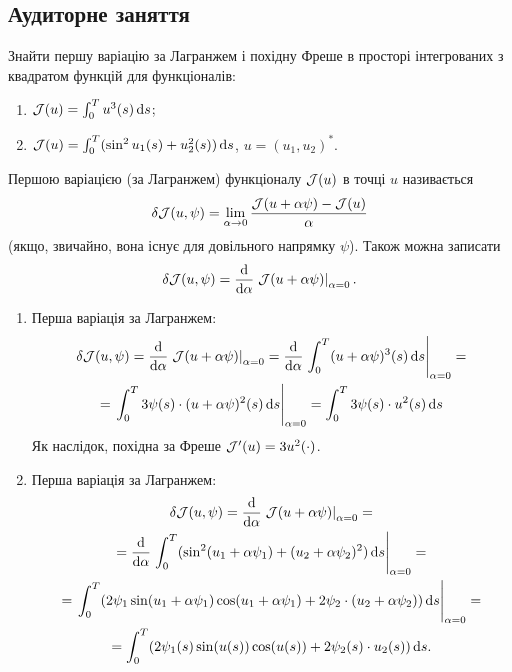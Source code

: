 \newpage

\subsection{Аудиторне заняття}

\begin{problem}
	Знайти першу варіацію за Лагранжем і похідну Фреше в просторі інтегрованих з квадратом функцій для функціоналів:
	\begin{enumerate}
		\item $\mathcal{J} (u) = \int_0^T u^3(s) \mathop{}\!\mathrm{d} s$;

		\item $\mathcal{J} (u) = \int_0^T (\sin^2 u_1(s) + u_2^2(s)) \mathop{}\!\mathrm{d} s$, $u = (u_1, u_2)^*$.
	\end{enumerate}
\end{problem}

\begin{solution}
	Першою варіацією (за Лагранжем) функціоналу $\mathcal{J}(u)$ в точці $u$ називається \[\delta \mathcal{J}(u, \psi) = \lim\limits_{\alpha \to 0} \frac{\mathcal{J}(u + \alpha \psi) - \mathcal{J}(u)}{\alpha}\] (якщо, звичайно, вона існує для довільного напрямку $\psi$). Також можна записати \[ \delta \mathcal{J}(u, \psi) = \frac{\mathop{}\!\mathrm{d}}{\mathop{}\!\mathrm{d} \alpha} \left.\mathcal{J}(u + \alpha \psi)\right|_{\alpha = 0}. \]

	\begin{enumerate}
		\item Перша варіація за Лагранжем:
		\begin{multline*} 
			\delta \mathcal{J}(u, \psi) = \frac{\mathop{}\!\mathrm{d}}{\mathop{}\!\mathrm{d} \alpha} \left.\mathcal{J}(u + \alpha \psi)\right|_{\alpha = 0} = \frac{\mathop{}\!\mathrm{d}}{\mathop{}\!\mathrm{d} \alpha} \left.\int_0^T(u + \alpha \psi)^3(s) \mathop{}\!\mathrm{d} s\right|_{\alpha = 0} = \\
			= \left.\int_0^T 3 \psi(s) \cdot (u + \alpha \psi)^2(s) \mathop{}\!\mathrm{d} s\right|_{\alpha = 0} = \int_0^T 3 \psi(s) \cdot u^2(s) \mathop{}\!\mathrm{d} s
		\end{multline*} 
		Як наслідок, похідна за Фреше $\mathcal{J}'(u) = 3 u^2(\cdot)$.

		\item Перша варіація за Лагранжем:
		\begin{multline*} 
			\delta \mathcal{J}(u, \psi) = \frac{\mathop{}\!\mathrm{d}}{\mathop{}\!\mathrm{d} \alpha} \left.\mathcal{J}(u + \alpha \psi)\right|_{\alpha = 0} = \\
			= \frac{\mathop{}\!\mathrm{d}}{\mathop{}\!\mathrm{d} \alpha} \left. \int_0^T (\sin^2 (u_1 + \alpha\psi_1) + (u_2 + \alpha \psi_2)^2) \mathop{}\!\mathrm{d} s\right|_{\alpha = 0} = \\
			= \left. \int_0^T (2 \psi_1 \sin(u_1 + \alpha \psi_1)\cos(u_1 + \alpha \psi_1) + 2\psi_2 \cdot (u_2 + \alpha \psi_2)) \mathop{}\!\mathrm{d} s\right|_{\alpha = 0} = \\
			= \int_0^T (2 \psi_1(s) \sin(u(s)) \cos(u(s)) + 2 \psi_2(s) \cdot u_2(s)) \mathop{}\!\mathrm{d} s.
		\end{multline*}
	\end{enumerate} 
\end{solution}


